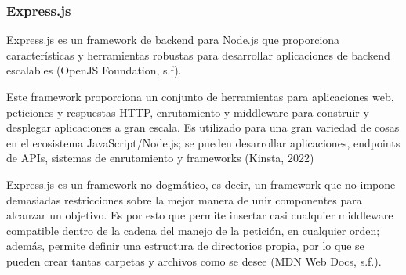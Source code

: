 \subsubsection{Express.js}
Express.js es un framework de backend para Node.js que proporciona características y herramientas robustas para desarrollar aplicaciones de backend escalables (OpenJS Foundation, s.f).

Este framework proporciona un conjunto de herramientas para aplicaciones web, peticiones y respuestas HTTP, enrutamiento y middleware para construir y desplegar aplicaciones a gran escala. Es utilizado para una gran variedad de cosas en el ecosistema JavaScript/Node.js; se pueden desarrollar aplicaciones, endpoints de APIs, sistemas de enrutamiento y frameworks (Kinsta, 2022)

Express.js es un framework no dogmático, es decir, un framework que no impone demasiadas restricciones sobre la mejor manera de unir componentes para alcanzar un objetivo. Es por esto que permite insertar casi cualquier middleware compatible dentro de la cadena del manejo de la petición, en cualquier orden; además, permite definir una estructura de directorios propia, por lo que se pueden crear tantas carpetas y archivos como se desee (MDN Web Docs, s.f.).